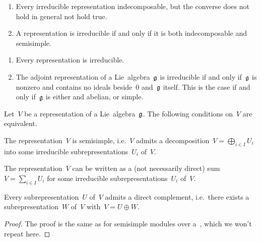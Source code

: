 \begin{remark}
  \leavevmode
  \begin{enumerate}
    \item
      Every irreducible representation indecomposable, but the converse does not hold in general not hold true.
    \item
      A representation is irreducible if and only if it is both indecomposable and semisimple.
  \end{enumerate}
\end{remark}


\begin{example}
  \leavevmode
  \begin{enumerate}
    \item
      Every {\onedimensional} representation is irreducible.
    \item
      The adjoint representation of a Lie~algebra~$\mathfrak{g}$ is irreducible if and only if~$\mathfrak{g}$ is nonzero and contains no ideals beside~$0$ and~$\mathfrak{g}$ itself.
      This is the case if and only if~$\mathfrak{g}$ is either {\onedimensional} and abelian, or simple.
  \end{enumerate}
\end{example}


\begin{proposition}
  Let~$V$ be a representation of a Lie~algebra~$\mathfrak{g}$.
  The following conditions on~$V$ are equivalent.
  \begin{equivalenceslist}
    \item
      The representation~$V$ is semisimple, i.e.~$V$ admits a decomposition~$V = \bigoplus_{i \in I} U_i$ into some irreducible subrepresentations~$U_i$ of~$V$.
    \item
      The representation~$V$ can be written as a (not necessarily direct) sum~$V = \sum_{i \in I} U_i$ for some irreducible subrepresentations~$U_i$ of~$V$.
    \item
      Every subrepresentation~$U$ of~$V$ admits a direct complement, i.e.\ there exists a subrepresentation~$W$ of~$V$ with~$V = U \oplus W$.
  \end{equivalenceslist}
\end{proposition}


\begin{proof}
  The proof is the same as for semisimple modules over a~\algebra{$\kf$}, which we won’t repeat here.
\end{proof}


